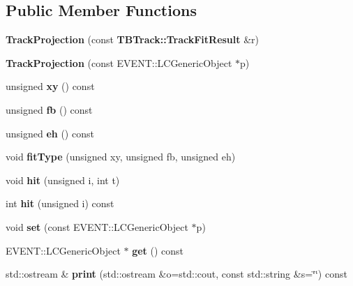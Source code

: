 \subsection*{Public Member Functions}
\begin{DoxyCompactItemize}
\item 
{\bfseries Track\-Projection} (const {\bf T\-B\-Track\-::\-Track\-Fit\-Result} \&r)\label{classTBTrack_1_1TrackProjection_a5687005151617c3972c01967fe2da734}

\item 
{\bfseries Track\-Projection} (const E\-V\-E\-N\-T\-::\-L\-C\-Generic\-Object $\ast$p)\label{classTBTrack_1_1TrackProjection_a3113d8b470f7a8e4de211e43a7d50fd6}

\item 
unsigned {\bfseries xy} () const \label{classTBTrack_1_1TrackProjection_a9d48d08c834d07e778d4381fb974505b}

\item 
unsigned {\bfseries fb} () const \label{classTBTrack_1_1TrackProjection_ad24e264233b83d4c9cd813881f2fbac7}

\item 
unsigned {\bfseries eh} () const \label{classTBTrack_1_1TrackProjection_a44289793d84283f8ff664659fd25821e}

\item 
void {\bfseries fit\-Type} (unsigned xy, unsigned fb, unsigned eh)\label{classTBTrack_1_1TrackProjection_ae0c43b50ae45c6e13c4bb01f09b3e74f}

\item 
void {\bfseries hit} (unsigned i, int t)\label{classTBTrack_1_1TrackProjection_ad2e6a1f8c2a971adf982d67b571f7292}

\item 
int {\bfseries hit} (unsigned i) const \label{classTBTrack_1_1TrackProjection_a3f563df4496127397acd6f047797ba0c}

\item 
void {\bfseries set} (const E\-V\-E\-N\-T\-::\-L\-C\-Generic\-Object $\ast$p)\label{classTBTrack_1_1TrackProjection_ad31ce23afa4dd066bd49bc30ba7962fe}

\item 
E\-V\-E\-N\-T\-::\-L\-C\-Generic\-Object $\ast$ {\bfseries get} () const \label{classTBTrack_1_1TrackProjection_abbf79bbd22e4f0c139277bb90ee4ccdd}

\item 
std\-::ostream \& {\bfseries print} (std\-::ostream \&o=std\-::cout, const std\-::string \&s=\char`\"{}\char`\"{}) const \label{classTBTrack_1_1TrackProjection_ab01859ecafcdf84813fa159a9a716d4d}

\end{DoxyCompactItemize}
